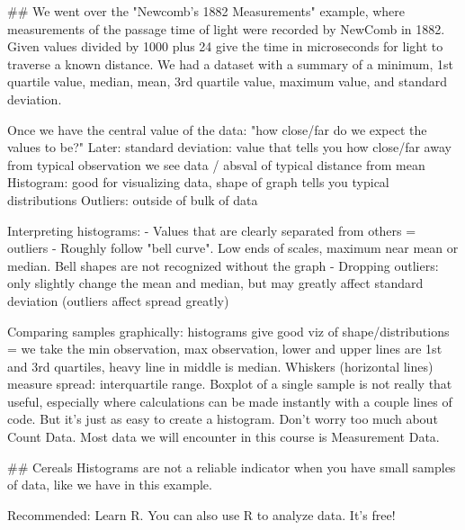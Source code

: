 ## We went over the "Newcomb's 1882 Measurements" example, where measurements of the passage time of light were recorded by NewComb in 1882. Given values divided by 1000 plus 24 give the time in microseconds for light to traverse a known distance. We had a dataset with a summary of a minimum, 1st quartile value, median, mean, 3rd quartile value, maximum value, and standard deviation.


Once we have the central value of the data: "how close/far do we expect the values to be?"
Later: standard deviation: value that tells you how close/far away from typical observation we see data / absval of typical distance from mean
Histogram: good for visualizing data, shape of graph tells you typical distributions
Outliers: outside of bulk of data

Interpreting histograms:
- Values that are clearly separated from others = outliers
- Roughly follow "bell curve". Low ends of scales, maximum near mean or median. Bell shapes are not recognized without the graph
- Dropping outliers: only slightly change the mean and median, but may greatly affect standard deviation (outliers affect spread greatly)

Comparing samples graphically: histograms give good viz of shape/distributions
 = we take the min observation, max observation, lower and upper lines are 1st and 3rd quartiles, heavy line in middle is median. Whiskers (horizontal lines) measure spread: interquartile range.
Boxplot of a single sample is not really that useful, especially where calculations can be made instantly with a couple lines of code. But it's just as easy to create a histogram.
Don't worry too much about Count Data.
Most data we will encounter in this course is Measurement Data.

## Cereals
Histograms are not a reliable indicator when you have small samples of data, like we have in this example.

Recommended: Learn R. You can also use R to analyze data. It's free!



